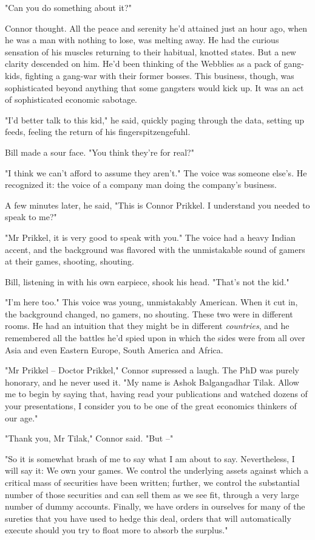 "Can you do something about it?"

Connor thought. All the peace and serenity he'd attained just an
hour ago, when he was a man with nothing to lose, was melting away.
He had the curious sensation of his muscles returning to their
habitual, knotted states. But a new clarity descended on him. He'd
been thinking of the Webblies as a pack of gang-kids, fighting a
gang-war with their former bosses. This business, though, was
sophisticated beyond anything that some gangsters would kick up. It
was an act of sophisticated economic sabotage.

"I'd better talk to this kid," he said, quickly paging through the
data, setting up feeds, feeling the return of his
fingerspitzengefuhl.

Bill made a sour face. "You think they're for real?"

"I think we can't afford to assume they aren't." The voice was
someone else's. He recognized it: the voice of a company man doing
the company's business.

A few minutes later, he said, "This is Connor Prikkel. I understand
you needed to speak to me?"

"Mr Prikkel, it is very good to speak with you." The voice had a
heavy Indian accent, and the background was flavored with the
unmistakable sound of gamers at their games, shooting, shouting.

Bill, listening in with his own earpiece, shook his head. "That's
not the kid."

"I'm here too." This voice was young, unmistakably American. When
it cut in, the background changed, no gamers, no shouting. These
two were in different rooms. He had an intuition that they might be
in different \emph{countries}, and he remembered all the battles
he'd spied upon in which the sides were from all over Asia and even
Eastern Europe, South America and Africa.

"Mr Prikkel -- Doctor Prikkel," Connor supressed a laugh. The PhD
was purely honorary, and he never used it. "My name is Ashok
Balgangadhar Tilak. Allow me to begin by saying that, having read
your publications and watched dozens of your presentations, I
consider you to be one of the great economics thinkers of our
age."

"Thank you, Mr Tilak," Connor said. "But --"

"So it is somewhat brash of me to say what I am about to say.
Nevertheless, I will say it: We own your games. We control the
underlying assets against which a critical mass of securities have
been written; further, we control the substantial number of those
securities and can sell them as we see fit, through a very large
number of dummy accounts. Finally, we have orders in ourselves for
many of the sureties that you have used to hedge this deal, orders
that will automatically execute should you try to float more to
absorb the surplus."

